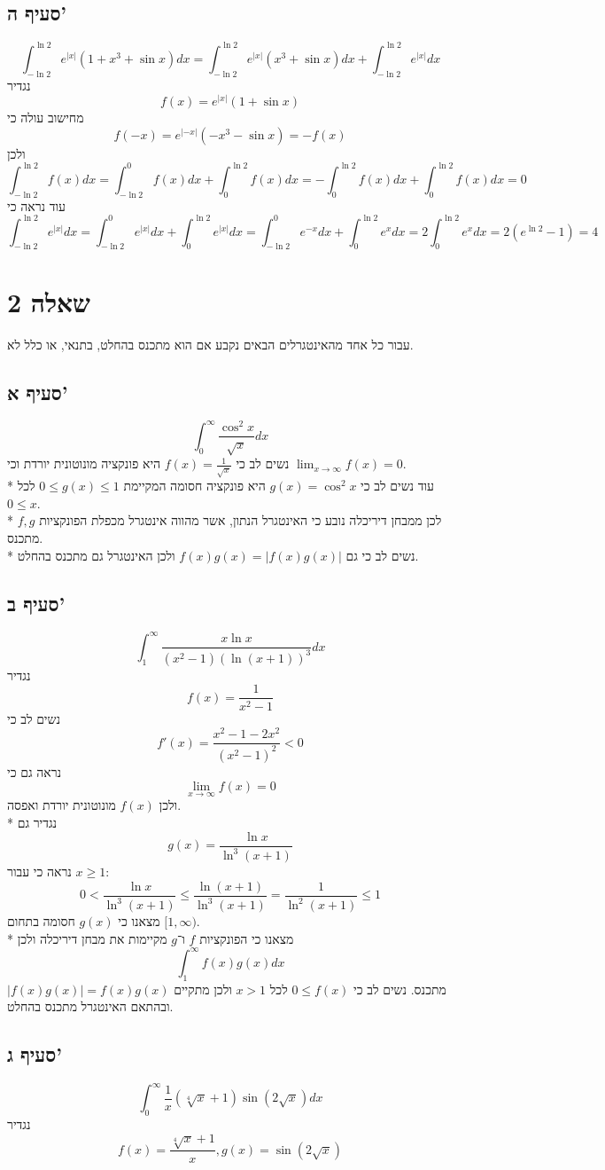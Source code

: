 \subsection{סעיף ה'}
\[
	\int_{-\ln 2}^{\ln 2} e^{|x|} (1 + x^3 + \sin x) dx
	= \int_{-\ln 2}^{\ln 2} e^{|x|} (x^3 + \sin x) dx
	+ \int_{-\ln 2}^{\ln 2} e^{|x|} dx
\]
נגדיר
\[
	f(x) = e^{|x|} (1 + \sin x)
\]
מחישוב עולה כי
\[
	f(-x) = e^{|-x|} (-x^3 - \sin x) = - f(x)
\]
ולכן
\[
	\int_{-\ln 2}^{\ln 2} f(x) dx
	= \int_{-\ln 2}^{0} f(x) dx + \int_{0}^{\ln 2} f(x) dx
	= -\int_{0}^{\ln 2} f(x) dx + \int_{0}^{\ln 2} f(x) dx
	= 0
\]
עוד נראה כי
\[
	\int_{-\ln 2}^{\ln 2} e^{|x|} dx
	= \int_{-\ln 2}^{0} e^{|x|} dx + \int_{0}^{\ln 2} e^{|x|} dx
	= \int_{-\ln 2}^{0} e^{-x} dx + \int_{0}^{\ln 2} e^{x} dx
	= 2\int_{0}^{\ln 2} e^{x} dx
	= 2 (e^{\ln 2} - 1) = 4
\]

\section{שאלה 2}
עבור כל אחד מהאינטגרלים הבאים נקבע אם הוא מתכנס בהחלט, בתנאי, או כלל לא.

\subsection{סעיף א'}
\[
	\int_0^\infty \frac{\cos^2 x}{\sqrt{x}}dx
\]
נשים לב כי $f(x) = \frac{1}{\sqrt{x}}$ היא פונקציה מונוטונית יורדת וכי $\lim_{x \to \infty} f(x) = 0$. \\*
עוד נשים לב כי $g(x) = \cos^2 x$ היא פונקציה חסומה המקיימת $0 \le g(x) \le 1$ לכל $0 \le x$. \\*
לכן ממבחן דיריכלה נובע כי האינטגרל הנתון, אשר מהווה אינטגרל מכפלת הפונקציות $f, g$ מתכנס. \\*
נשים לב כי גם $f(x) g(x) = |f(x) g(x)|$ ולכן האינטגרל גם מתכנס בהחלט.

\subsection{סעיף ב'}
\[
	\int_1^\infty \frac{x \ln x}{(x^2 - 1){(\ln(x + 1))}^3} dx
\]
נגדיר
\[
	f(x) = \frac{1}{x^2 - 1}
\]
נשים לב כי
\[
	f'(x) = \frac{x^2 - 1 - 2x^2}{{(x^2 - 1)}^2} < 0
\]
נראה גם כי
\[
	\lim_{x \to \infty} f(x) = 0
\]
ולכן $f(x)$ מונוטונית יורדת ואפסה. \\*
נגדיר גם
\[
	g(x) = \frac{\ln x}{\ln^3(x + 1)}
\]
נראה כי עבור $x \ge 1$:
\[
	0 < \frac{\ln x}{\ln^3(x + 1)}
	\le \frac{\ln(x + 1)}{\ln^3(x + 1)}
	= \frac{1}{\ln^2(x + 1)} \le 1
\]
מצאנו כי $g(x)$ חסומה בתחום $[1, \infty)$. \\* %
מצאנו כי הפונקציות $f$ ו־$g$ מקיימות את מבחן דיריכלה ולכן
\[
	\int_1^\infty f(x) g(x) dx
\]
מתכנס. נשים לב כי $0 \le f(x)$ לכל $x > 1$ ולכן מתקיים $|f(x) g(x)| = f(x) g(x)$ ובהתאם האינטגרל מתכנס בהחלט.

\subsection{סעיף ג'}
\[
	\int_0^\infty \frac{1}{x} (\sqrt[4]{x} + 1) \sin \left( 2 \sqrt{x} \right) dx
\]
נגדיר
\[
	f(x) = \frac{\sqrt[4]{x} + 1}{x}, g(x) = \sin\left(2\sqrt{x}\right)
\]

